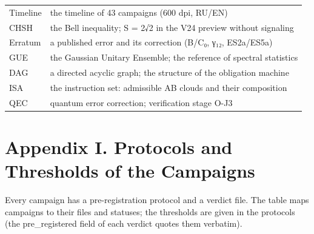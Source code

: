 \documentclass[11pt,a4paper]{article}
\begin{document}
\begin{table}[htbp]
\begin{tabular}{p{} p{}}
Timeline & the timeline of 43 campaigns (600 dpi, RU/EN) \\
CHSH & the Bell inequality; S = 2√2 in the V24 preview without signaling \\
Erratum & a published error and its correction (B/C₀, γ₁₂, ES2a/ES5a) \\
GUE & the Gaussian Unitary Ensemble; the reference of spectral statistics \\
DAG & a directed acyclic graph; the structure of the obligation machine \\
ISA & the instruction set: admissible AB clouds and their composition \\
QEC & quantum error correction; verification stage O-J3 \\
\bottomrule
\end{tabular}
\end{table}

\section{Appendix I. Protocols and Thresholds of the Campaigns}

Every campaign has a pre-registration protocol and a verdict file. The table maps campaigns to their files and statuses; the thresholds are given in the protocols (the pre\_registered field of each verdict quotes them verbatim).
\end{document}
